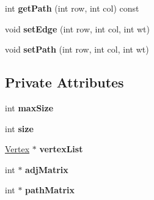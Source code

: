 \begin{DoxyCompactItemize}
\item 
\hypertarget{class_weighted_graph_a878188104e22c8ec0960d723ef4f58d9}{int {\bfseries get\+Path} (int row, int col) const }\label{class_weighted_graph_a878188104e22c8ec0960d723ef4f58d9}

\item 
\hypertarget{class_weighted_graph_aca51b1a746202621345709290a0ddd98}{void {\bfseries set\+Edge} (int row, int col, int wt)}\label{class_weighted_graph_aca51b1a746202621345709290a0ddd98}

\item 
\hypertarget{class_weighted_graph_a7872c78e6db2c55fc064b121303bb9d4}{void {\bfseries set\+Path} (int row, int col, int wt)}\label{class_weighted_graph_a7872c78e6db2c55fc064b121303bb9d4}

\end{DoxyCompactItemize}
\subsection*{Private Attributes}
\begin{DoxyCompactItemize}
\item 
\hypertarget{class_weighted_graph_ae8cd4e7b91702a470e59472979e94cb5}{int {\bfseries max\+Size}}\label{class_weighted_graph_ae8cd4e7b91702a470e59472979e94cb5}

\item 
\hypertarget{class_weighted_graph_a4452835ad9619580ff968a4d6a9cfe44}{int {\bfseries size}}\label{class_weighted_graph_a4452835ad9619580ff968a4d6a9cfe44}

\item 
\hypertarget{class_weighted_graph_a2ad6c13bc100655ac45c6d97619bfb49}{\hyperlink{class_weighted_graph_1_1_vertex}{Vertex} $\ast$ {\bfseries vertex\+List}}\label{class_weighted_graph_a2ad6c13bc100655ac45c6d97619bfb49}

\item 
\hypertarget{class_weighted_graph_a7d7bdb83dbcfe0b7518db650e293b94f}{int $\ast$ {\bfseries adj\+Matrix}}\label{class_weighted_graph_a7d7bdb83dbcfe0b7518db650e293b94f}

\item 
\hypertarget{class_weighted_graph_a2bdcff3d3f13972f28e38a14957fcc34}{int $\ast$ {\bfseries path\+Matrix}}\label{class_weighted_graph_a2bdcff3d3f13972f28e38a14957fcc34}

\end{DoxyCompactItemize}


